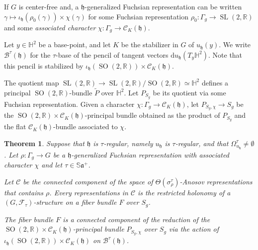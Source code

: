 \documentclass[reqno,10pt]{amsart}
\theoremstyle{plain}
\newtheorem{thm}{Theorem}[section]
\theoremstyle{definition}
\theoremstyle{remark}
\newcommand{\type}{\tau}
\newcommand{\R}{\mathbb{R}}
\newcommand{\Sph}{\mathbb{S}}
\DeclareMathOperator{\SL}{SL}
\DeclareMathOperator{\SO}{SO}
\newcommand{\ie}{namely }
\begin{document}
If $G$ is center-free and, a $\mathfrak{h}$-generalized Fuchsian representation can be written $\gamma\mapsto \iota_\mathfrak{h}(\rho_0(\gamma))\times \chi(\gamma)$ for some Fuchsian representation $\rho_0:\Gamma_g\to\SL(2,\R)$ and some \emph{associated character} $\chi:\Gamma_g\to \mathcal{C}_K(\mathfrak{h})$.
\medskip

Let $y\in \mathbb{H}^2$ be a base-point, and let $K$ be the stabilizer in $G$ of $u_\mathfrak{h}(y)$. We write $\mathcal{B}^\type(\mathfrak{h})$ for the $\type$-base of the pencil of tangent vectors $\mathrm{d}u_\mathfrak{h}(T_y\mathbb{H}^2)$. Note that this pencil is stabilized by $\iota_\mathfrak{h}\left(\SO(2,\R)\right)\times \mathcal{C}_K(\mathfrak{h})$.

The quotient map  $\SL(2,\R)\to \SL(2,\R)/\SO(2,\R)\simeq \mathbb{H}^2$ defines a principal $\SO(2,\R)$-bundle $\widetilde{P}$ over $\mathbb{H}^2$. Let $P_{S_g}$ be its quotient via some Fuchsian representation. Given a character $\chi:\Gamma_g\to \mathcal{C}_K(\mathfrak{h})$, let $P_{S_g,\chi}\to S_g$ be the $\SO(2,\R)\times \mathcal{C}_K(\mathfrak{h})$-principal bundle obtained as the product of $P_{S_g}$ and the flat $\mathcal{C}_K(\mathfrak{h})$-bundle associated to $\chi$. 

\begin{thm}
\label{thm:HighTeich}
Suppose that $\mathfrak{h}$ is \emph{$\type$-regular}, \ie $u_\mathfrak{h}$ is $\type$-regular, and that $\Omega^\type_{u_\mathfrak{h}}\neq \emptyset$. Let $\rho:\Gamma_g\to G$ be a $\mathfrak{h}$-generalized Fuchsian representation with associated character $\chi$ and let $\type\in \Sph\mathfrak{a}^+$.

Let $\mathcal{C}$ be the connected component of the space of $\Theta(\sigma^\type_\rho)$-Anosov representations that contains $\rho$. Every representations in $\mathcal{C}$ is the restricted holonomy of a $\left(G,\mathcal{F}_{\type}\right)$-structure \emph{on a fiber bundle} $F$ over $S_g$.

\medskip

The fiber bundle $F$ is a connected component of the reduction of the $\SO(2,\R)\times \mathcal{C}_K(\mathfrak{h})$-principal bundle $P_{S_g,\chi}$ over $S_g$ via the action of $\iota_\mathfrak{h}\left(\SO(2,\R)\right)\times \mathcal{C}_K(\mathfrak{h})$ on $\mathcal{B}^\type(\mathfrak{h})$. %
\end{thm}
\end{document}
